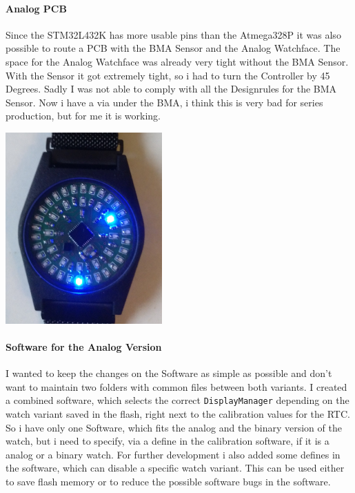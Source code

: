 \paragraph{Analog PCB}
Since the STM32L432K has more usable pins than the Atmega328P it was also possible to route a PCB with the BMA Sensor and the Analog Watchface.
The space for the Analog Watchface was already very tight without the BMA Sensor. With the Sensor it got extremely tight, so i had to turn the Controller by 45 Degrees. Sadly I was not able to comply with all the Designrules for the BMA Sensor. Now i have a via under the BMA, i think this is very bad for series production, but for me it is working.

\begin{center}
\includegraphics[width=0.45\textwidth]{../Pictures/AnalogSTM.jpg}
\end{center}

\paragraph{Software for the Analog Version}
I wanted to keep the changes on the Software as simple as possible and don't want to maintain two folders with common files between both variants. I created a combined software, which selects the correct \verb!DisplayManager! depending on  the watch variant saved in the flash, right next to the calibration values for the RTC. So i have only one Software, which fits the analog and the binary version of the watch, but i need to specify, via a define in the calibration software, if it is a analog or a binary watch. For further development i also added some defines in the software, which can disable a specific watch variant. This can be used either to save flash memory or to reduce the possible software bugs in the software.
